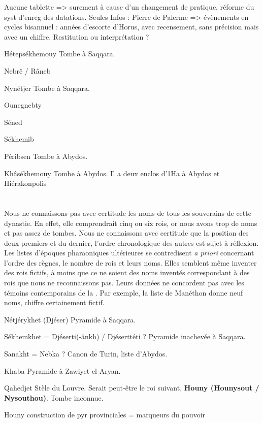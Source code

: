 Aucune tablette => surement à cause d'un changement de pratique, 
réforme du syst d'enreg des datations. Seules Infos : Pierre de Palerme
=> évènements en cycles bisannuel : années d'escorte d'Horus, avec 
recensement, sans précision mais avec un chiffre. Restitution ou 
interprétation ?

\begin{listerois}
  \item [Hétepsékhemouy] Tombe à Saqqara.
  \item [Nebrê / Râneb]
  \item [Nynétjer] Tombe à Saqqara.
  \item [Ounegnebty]
  \item [Séned]
  \item [Sékhemib]
  \item [Péribsen] Tombe à Abydos.
  \item [Khâsékhemouy] Tombe à Abydos. Il a deux enclos d'1Ha à Abydos 
        et Hiérakonpolis
\end{listerois}

\section{\OK}


\subsection{\texorpdfstring{}{IIIe dynastie}}

Nous ne connaissons pas avec certitude les noms de tous les souverains 
de cette dynastie. En effet, elle comprendrait cinq ou six rois, or 
nous avons trop de noms et pas assez de tombes. Nous ne connaissons 
avec certitude que la position des deux premiers et du dernier, 
l'ordre chronologique des autres est sujet à réflexion. Les listes 
d'époques pharaoniques ultérieures se contredisent \emph{a priori} 
concernant l'ordre des règnes, le nombre de rois et leurs noms. Elles 
semblent même inventer des rois fictifs, à moins que ce ne soient des 
noms inventés correspondant à des rois que nous ne reconnaissons pas. 
Leurs données ne concordent pas avec les témoins contemporains de la 
. Par exemple, la liste de Manéthon donne neuf noms, chiffre 
certainement fictif.

\begin{listerois}
  \item [Nétjérykhet (Djéser)] Pyramide à Saqqara.
  \item [Sékhemkhet] = Djéserti(-ânkh) / Djéserttéti ? Pyramide 
        inachevée à Saqqara.
  \item [Sanakht] = Nebka ? Canon de Turin, liste d'Abydos.
  \item [Khaba] Pyramide à Zawiyet el-Aryan.
  \item [Qahedjet] Stèle du Louvre. Serait peut-être le roi suivant, 
        \textbf{\sffamily Houny (Hounysout / Nysouthou)}. 
        Tombe inconnue.
  \item [Houny] construction de pyr provinciales = marqueurs du pouvoir
\end{listerois}


